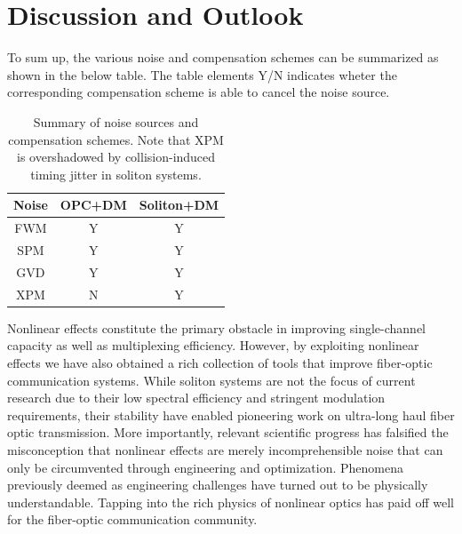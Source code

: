 \documentclass[%
 reprint,
 amsmath,amssymb,
 aps,
]{revtex4-2}
\begin{document}
\section{Discussion and Outlook}
To sum up, the various noise and compensation schemes can be summarized as 
shown in the below table. The table elements Y/N indicates wheter 
the corresponding compensation scheme is able to cancel the noise source. 
\begin{table}[h]
    \begin{tabular}{ccc}
    \toprule
    Noise
    &
    OPC+DM
    &
    Soliton+DM\\
    \midrule
    FWM
    &
    Y
    &
    Y
    \\
    SPM
    &
    Y
    &
    Y
    \\
    GVD & Y & Y \\
    XPM & N & Y \\
    \bottomrule
    \end{tabular}
    \caption{Summary of noise sources and compensation schemes. 
    Note that XPM is overshadowed by collision-induced timing jitter 
    in soliton systems. }
\end{table}
Nonlinear effects constitute the primary obstacle in 
improving single-channel capacity as well as multiplexing efficiency. 
However, by exploiting nonlinear effects we have also obtained 
a rich collection of tools that improve fiber-optic communication systems. 
While soliton systems are not the focus of current research 
due to their low spectral efficiency and stringent modulation requirements, 
their stability have enabled pioneering work on ultra-long haul 
fiber optic transmission. More importantly, 
relevant scientific progress has falsified the misconception that 
nonlinear effects are merely incomprehensible noise that 
can only be circumvented through engineering and optimization. 
Phenomena previously deemed as engineering challenges 
have turned out to be physically understandable. 
Tapping into the rich physics of nonlinear optics has paid off well 
for the fiber-optic communication community. 
\end{document}

